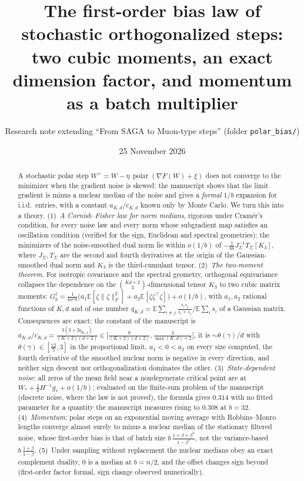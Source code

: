 \documentclass[10pt]{article}
\title{\vspace{-2em}The first-order bias law of stochastic orthogonalized steps:\\
two cubic moments, an exact dimension factor, and momentum as a batch multiplier}
\author{Research note extending ``From SAGA to Muon-type steps'' (folder \texttt{polar\_bias/})}
\date{25 November 2026}
\theoremstyle{definition}
\theoremstyle{remark}
\newcommand{\E}{\mathbb{E}}
\newcommand{\nF}[1]{\|#1\|_{F}}
\newcommand{\polar}{\operatorname{polar}}
\newcommand{\st}{\dagger}
\begin{document}
\maketitle

\begin{abstract}
A stochastic polar step $W^+=W-\eta\,\polar(\nabla F(W)+\xi)$ does not converge to the minimizer when the gradient
noise is skewed: the manuscript shows that the limit gradient is minus a nuclear median of the noise and gives a
\emph{formal} $1/b$ expansion for i.i.d.\ entries, with a constant $a_{K,d}/c_{K,d}$ known only by Monte Carlo. We
turn this into a theory. (1)~\emph{A Cornish--Fisher law for norm medians}, rigorous under Cram\'er's condition, for
every noise law and every norm whose subgradient map satisfies an oscillation condition (verified for the sign,
Euclidean and spectral geometries): the minimizers of the noise-smoothed dual norm lie within $o(1/b)$ of
$-\frac1{6b}J_\Sigma^{-1}T_\Sigma[K_3]$, where $J_\Sigma,T_\Sigma$ are the second and fourth derivatives at the origin
of the Gaussian-smoothed dual norm and $K_3$ is the third-cumulant tensor. (2)~\emph{The two-moment theorem.} For
isotropic covariance and the spectral geometry, orthogonal equivariance collapses the dependence on the
$\binom{Kd+2}3$-dimensional tensor $K_3$ to two cubic matrix moments:
$G^\st_b=\frac1{6\sigma^2b}\big(a_1\E[\zeta\nF\zeta^2]+a_2\E[\zeta\zeta^\top\zeta]\big)+o(1/b)$, with $a_1,a_2$
rational functions of $K,d$ and of one number $q_{K,d}=\E\sum_{i\ne j}\frac{s_is_j}{s_i+s_j}/\E\sum_is_i$ of a Gaussian
matrix. Consequences are exact: the constant of the manuscript is
$a_{K,d}/c_{K,d}=\frac{3(3+2q_{K,d})}{(K+2)(d+2)}\in\big[\frac{9}{(K+2)(d+2)},\frac3{\max(K,d)+2}\big]$, it is
$\sim\theta(\gamma)/d$ with $\theta(\gamma)\in[\frac{12}5,3]$ in the proportional limit, $a_1<0<a_2$ on every size
computed, the fourth derivative of the smoothed nuclear norm is negative in every direction, and neither sign descent
nor orthogonalization dominates the other. (3)~\emph{State-dependent noise}: all zeros of the mean field near a
nondegenerate critical point are at $W_\ast+\frac1bH^{-1}g_\ast+o(1/b)$; evaluated on the finite-sum
problem of the manuscript (discrete noise, where the law is not proved), the formula gives $0.314$ with no fitted
parameter for a quantity the manuscript measures rising to $0.308$ at $b=32$. (4)~\emph{Momentum}: polar steps on an
exponential moving average with Robbins--Monro lengths converge almost surely to minus a nuclear median of the
stationary filtered noise, whose first-order bias is that of batch size $b\,\frac{1+\beta+\beta^2}{1-\beta^2}$, not the
variance-based $b\,\frac{1+\beta}{1-\beta}$. (5)~Under sampling without replacement the nuclear medians obey an exact
complement duality, $0$ is a median at $b=n/2$, and the offset changes sign beyond (first-order factor formal, sign
change observed numerically).
\end{abstract}
\end{document}
